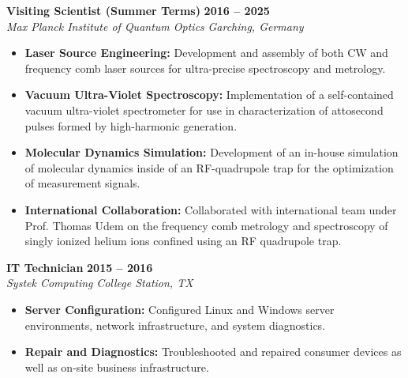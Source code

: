 \documentclass[a4paper,11pt]{extarticle}
\newcommand{\resumeentryC}[4]{
	\noindent\textbf{#2} \hfill \textbf{#1}\\
	\textit{#3} \hfill \textit{#4}
}
\begin{document}
	\vspace{0.3em}
	\resumeentryC{2016 -- 2025}{Visiting Scientist (Summer Terms)}{Max Planck Institute of Quantum Optics}{Garching, Germany}
	\begin{itemize}[leftmargin=1.2em, itemsep=0.2em]
		\item \textbf{Laser Source Engineering:} Development and assembly of both CW and frequency comb laser sources for ultra-precise spectroscopy and metrology.
		\item \textbf{Vacuum Ultra-Violet Spectroscopy:} Implementation of a self-contained vacuum ultra-violet spectrometer for use in characterization of attosecond pulses formed by high-harmonic generation.
		\item \textbf{Molecular Dynamics Simulation:} Development of an in-house simulation of molecular dynamics inside of an RF-quadrupole trap for the optimization of measurement signals.
		\item \textbf{International Collaboration:} Collaborated with international team under Prof. Thomas Udem on the frequency comb metrology and spectroscopy of singly ionized helium ions confined using an RF quadrupole trap.
	\end{itemize}
	
	\vspace{0.3em}
	\resumeentryC{2015 -- 2016}{IT Technician}{Systek Computing}{College Station, TX}
	\begin{itemize}[leftmargin=1.2em, itemsep=0.2em]
		\item \textbf{Server Configuration:} Configured Linux and Windows server environments, network infrastructure, and system diagnostics.
		\item \textbf{Repair and Diagnostics:} Troubleshooted and repaired consumer devices as well as on-site business infrastructure.
	\end{itemize}
	
\end{document}
